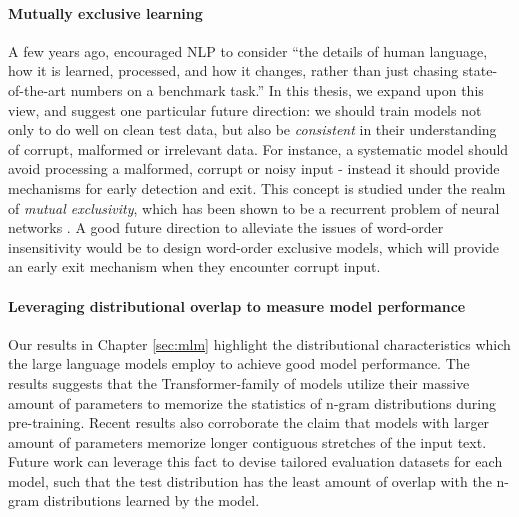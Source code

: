 \documentclass[letterpaper, 12pt]{report}
\begin{document}
\paragraph{Mutually exclusive learning} A few years ago, \cite{manning-etal-2015-computational} encouraged NLP to consider ``the details of human language, how it is learned, processed, and how it changes, rather than just chasing state-of-the-art numbers on a benchmark task.'' In this thesis, we expand upon this view, and suggest one particular future direction: we should train models not only to do well on clean test data, but also be \textit{consistent} in their understanding of corrupt, malformed or irrelevant data. For instance, a systematic model should avoid processing a malformed, corrupt or noisy input - instead it should provide mechanisms for early detection and exit. This concept is studied under the realm of \textit{mutual exclusivity}, which has been shown to be a recurrent problem of neural networks \citep{gandhi2019mutual}. A good future direction to alleviate the issues of word-order insensitivity would be to design word-order exclusive models, which will provide an early exit mechanism when they encounter corrupt input.

\paragraph{Leveraging distributional overlap to measure model performance} Our results in Chapter \autoref{sec:mlm} highlight the distributional characteristics which the large language models employ to achieve good model performance. The results suggests that the Transformer-family of models utilize their massive amount of parameters to memorize the statistics of n-gram distributions during pre-training. Recent results \citep{feldman2020neural, carlini2021, carlini2022a} also corroborate the claim that models with larger amount of parameters memorize longer contiguous stretches of the input text. Future work can leverage this fact to devise tailored evaluation datasets for each model, such that the test distribution has the least amount of overlap with the n-gram distributions learned by the model.
\end{document}
